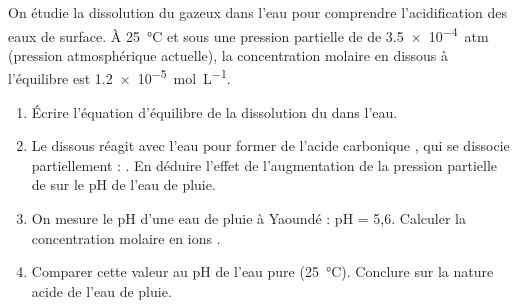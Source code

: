 \documentclass[11pt]{article}
\begin{document}
\begin{exercice}
On étudie la dissolution du  gazeux dans l'eau pour comprendre l'acidification des eaux de surface. À \SI{25}{\celsius} et sous une pression partielle de  de \SI{3,5e-4}{atm} (pression atmosphérique actuelle), la concentration molaire en  dissous à l'équilibre est \SI{1,2e-5}{mol.L^{-1}}.
\begin{enumerate}
    \item Écrire l'équation d'équilibre de la dissolution du  dans l'eau.
    \item Le  dissous réagit avec l'eau pour former de l'acide carbonique , qui se dissocie partiellement : . En déduire l'effet de l'augmentation de la pression partielle de  sur le pH de l'eau de pluie.
    \item On mesure le pH d'une eau de pluie à Yaoundé : pH = 5,6. Calculer la concentration molaire en ions .
    \item Comparer cette valeur au pH de l'eau pure (\SI{25}{\celsius}). Conclure sur la nature acide de l'eau de pluie.
\end{enumerate}
\end{exercice}
\end{document}
